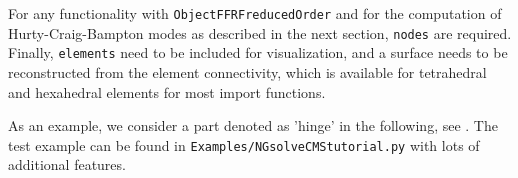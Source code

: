 For any functionality with \texttt{ObjectFFRFreducedOrder} and for the computation of Hurty-Craig-Bampton modes as described in the next section, \texttt{nodes}
are required.
Finally, \texttt{elements} need to be included for visualization, and a surface needs to be reconstructed from the element connectivity, which is available for tetrahedral and hexahedral elements for most import functions.

As an example, we consider a part denoted as 'hinge' in the following, see . The test example can be found in \texttt{Examples/NGsolveCMStutorial.py} with lots of additional features.

